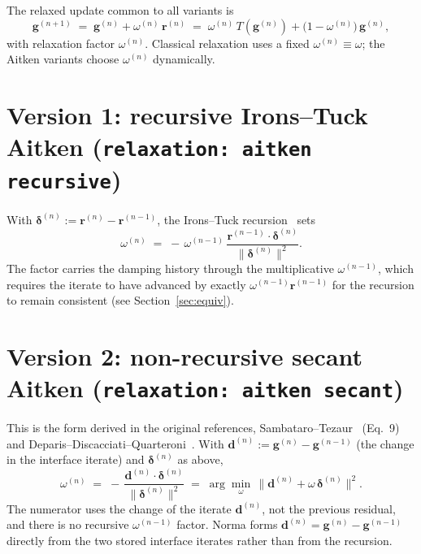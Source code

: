 \documentclass[11pt]{article}
\begin{document}
The relaxed update common to all variants is
\begin{equation}
    \bm{g}^{(n+1)} \;=\; \bm{g}^{(n)} + \omega^{(n)} \, \bm{r}^{(n)}
    \;=\; \omega^{(n)} \, T\!\left(\bm{g}^{(n)}\right)
        + \bigl(1 - \omega^{(n)}\bigr)\,\bm{g}^{(n)} ,
    \label{eq:update}
\end{equation}
with relaxation factor $\omega^{(n)}$. Classical relaxation uses a fixed
$\omega^{(n)} \equiv \omega$; the Aitken variants choose $\omega^{(n)}$
dynamically.

\section{Version 1: recursive Irons--Tuck Aitken (\texttt{relaxation: aitken recursive})}

With $\bm{\delta}^{(n)} := \bm{r}^{(n)} - \bm{r}^{(n-1)}$, the Irons--Tuck
recursion~\cite{IronsTuck} sets
\begin{equation}
    \omega^{(n)} \;=\;
    -\,\omega^{(n-1)}\,
    \frac{\bm{r}^{(n-1)} \cdot \bm{\delta}^{(n)}}
         {\bigl\lVert \bm{\delta}^{(n)} \bigr\rVert^{2}} .
    \label{eq:ironstuck}
\end{equation}
The factor carries the damping history through the multiplicative
$\omega^{(n-1)}$, which requires the iterate to have advanced by exactly
$\omega^{(n-1)}\bm{r}^{(n-1)}$ for the recursion to remain consistent (see
Section~\ref{sec:equiv}).

\section{Version 2: non-recursive secant Aitken (\texttt{relaxation: aitken secant})}

This is the form derived in the original references,
Sambataro--Tezaur~\cite{SambataroTezaur} (Eq.~9) and
Deparis--Discacciati--Quarteroni~\cite{Deparis}. With
$\bm{d}^{(n)} := \bm{g}^{(n)} - \bm{g}^{(n-1)}$ (the change in the interface
iterate) and $\bm{\delta}^{(n)}$ as above,
\begin{equation}
    \omega^{(n)} \;=\;
    -\,\frac{\bm{d}^{(n)} \cdot \bm{\delta}^{(n)}}
            {\bigl\lVert \bm{\delta}^{(n)} \bigr\rVert^{2}}
    \;=\; \arg\min_{\omega}\,
          \bigl\lVert \bm{d}^{(n)} + \omega\,\bm{\delta}^{(n)} \bigr\rVert^{2} .
    \label{eq:secant}
\end{equation}
The numerator uses the change of the iterate $\bm{d}^{(n)}$, not the previous
residual, and there is no recursive $\omega^{(n-1)}$ factor. Norma forms
$\bm{d}^{(n)} = \bm{g}^{(n)} - \bm{g}^{(n-1)}$ directly from the two stored
interface iterates rather than from the recursion.
\end{document}
